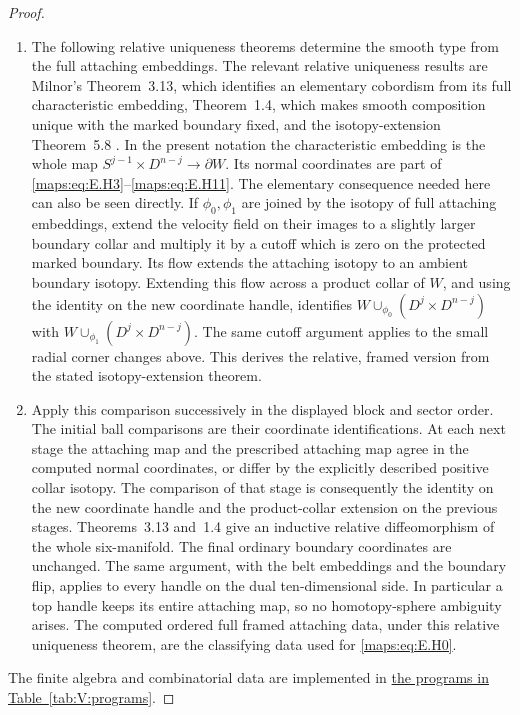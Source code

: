 \begin{proof}
\begin{enumerate}[label=\arabic*.,leftmargin=*]
\item The following relative uniqueness theorems determine the smooth
type from the full attaching embeddings.  The relevant relative uniqueness
results are Milnor's Theorem~3.13, which identifies an elementary
cobordism from its full characteristic embedding, Theorem~1.4,
which makes smooth composition unique with the marked boundary
fixed, and the isotopy-extension Theorem~5.8
\cite{mapsMilnor65}.  In the present notation the characteristic
embedding is the whole map
$S^{j-1}\times D^{n-j}\longrightarrow\partial W$.  Its normal coordinates
are part of \eqref{maps:eq:E.H3}--\eqref{maps:eq:E.H11}.  The elementary consequence needed
here can also be seen directly.  If $\phi_0,\phi_1$ are joined
by the isotopy of full attaching embeddings, extend
the velocity field on their images to a slightly larger boundary
collar and multiply it by a cutoff which is zero on the protected
marked boundary.  Its flow extends the attaching isotopy to an
ambient boundary isotopy.  Extending this flow across a product
collar of $W$, and using the identity on the new coordinate handle,
identifies $W\cup_{\phi_0}(D^j\times D^{n-j})$ with
$W\cup_{\phi_1}(D^j\times D^{n-j})$.  The same cutoff argument
applies to the small radial corner changes above.  This derives
the relative, framed version from the stated isotopy-extension
theorem.

\item Apply this comparison successively in the displayed block and
sector order.  The initial ball comparisons are their coordinate
identifications.  At each next stage the attaching map
and the prescribed attaching map agree in the computed normal
coordinates, or differ by the explicitly described positive
collar isotopy.  The comparison of that stage is consequently
the identity on the new coordinate handle and the product-collar
extension on the previous stages.  Theorems~3.13 and~1.4 give an
inductive relative diffeomorphism of the whole six-manifold.
The final ordinary boundary coordinates are unchanged.  The
same argument, with the belt embeddings and the boundary flip, applies to every handle on the dual ten-dimensional
side.  In particular a top handle keeps its entire attaching map, so no homotopy-sphere ambiguity arises.  The computed
ordered full framed attaching data, under this relative uniqueness
theorem, are the classifying data used for \eqref{maps:eq:E.H0}.
\end{enumerate}
The finite algebra and combinatorial data are implemented in \hyperlink{prog:V:framings}{the programs in Table~\ref*{tab:V:programs}}.
\end{proof}